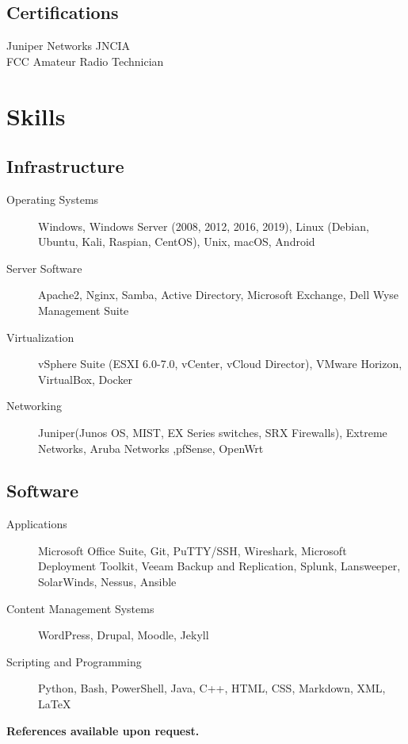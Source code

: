 \documentclass{article}
\begin{document}
\begin{samepage}
\begin{minipage}[t]{.35\textwidth}
	\subsection*{Certifications}
	Juniper Networks JNCIA \\
	FCC Amateur Radio Technician
\end{minipage}%

\section{Skills}

\subsection{Infrastructure}
\begin{description}
\item[Operating Systems] Windows, Windows Server (2008, 2012, 2016, 2019), Linux (Debian, Ubuntu, Kali, Raspian, CentOS), Unix,  macOS, Android
\item[Server Software] Apache2, Nginx, Samba, Active Directory, Microsoft Exchange, Dell Wyse Management Suite
\item[Virtualization] vSphere Suite (ESXI 6.0-7.0, vCenter, vCloud Director), VMware Horizon, VirtualBox, Docker
\item[Networking] Juniper(Junos OS, MIST, EX Series switches, SRX Firewalls), Extreme Networks, Aruba Networks ,pfSense, OpenWrt
\end{description}

\subsection{Software}

\begin{description}
\item[Applications] Microsoft Office Suite, Git, PuTTY/SSH, Wireshark, Microsoft Deployment Toolkit, Veeam Backup and Replication, Splunk, Lansweeper, SolarWinds, Nessus, Ansible
\item[Content Management Systems] WordPress, Drupal, Moodle, Jekyll
\item[Scripting and Programming] Python, Bash, PowerShell, Java, C++, HTML, CSS, Markdown, XML, {\LaTeX}
\end{description}


\begin{center}
\textbf{References available upon request.}
\end{center}

\thispagestyle{empty}
\end{samepage}
\end{document}
